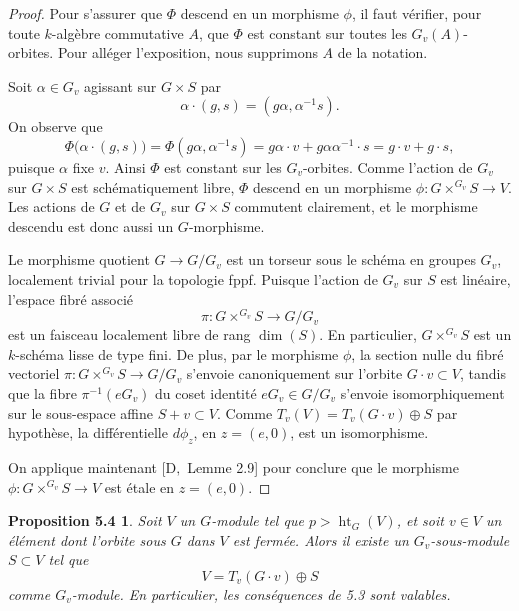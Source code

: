 \documentclass[11pt]{article}
\newcommand{\htG}{\operatorname{ht}_G}
\newtheorem*{proposition54}{Proposition 5.4}
\begin{document}
\begin{proof}
Pour s'assurer que \(\Phi\) descend en un morphisme \(\phi\), il faut vérifier, pour toute
\(k\)-algèbre commutative \(A\), que \(\Phi\) est constant sur toutes les
\(G_v(A)\)-orbites. Pour alléger l'exposition, nous supprimons \(A\) de la notation.

Soit \(\alpha\in G_v\) agissant sur \(G\times S\) par
\[
  \alpha\cdot(g,s)=(g\alpha,\alpha^{-1}s).
\]
On observe que
\[
  \Phi\bigl(\alpha\cdot(g,s)\bigr)=\Phi(g\alpha,\alpha^{-1}s)
  =g\alpha\cdot v+g\alpha\alpha^{-1}\cdot s
  =g\cdot v+g\cdot s,
\]
puisque \(\alpha\) fixe \(v\). Ainsi \(\Phi\) est constant sur les \(G_v\)-orbites. Comme
l'action de \(G_v\) sur \(G\times S\) est schématiquement libre, \(\Phi\) descend en un
morphisme \(\phi:G\times^{G_v}S\to V\). Les actions de \(G\) et de \(G_v\) sur
\(G\times S\) commutent clairement, et le morphisme descendu est donc aussi un
\(G\)-morphisme.

Le morphisme quotient \(G\to G/G_v\) est un torseur sous le schéma en groupes \(G_v\),
localement trivial pour la topologie fppf. Puisque l'action de \(G_v\) sur \(S\) est
linéaire, l'espace fibré associé
\[
  \pi:G\times^{G_v}S\longrightarrow G/G_v
\]
est un faisceau localement libre de rang \(\dim(S)\). En particulier,
\(G\times^{G_v}S\) est un \(k\)-schéma lisse de type fini. De plus, par le morphisme
\(\phi\), la section nulle du fibré vectoriel \(\pi:G\times^{G_v}S\to G/G_v\) s'envoie
canoniquement sur l'orbite \(G\cdot v\subset V\), tandis que la fibre \(\pi^{-1}(eG_v)\)
du coset identité \(eG_v\in G/G_v\) s'envoie isomorphiquement sur le sous-espace affine
\(S+v\subset V\). Comme \(T_v(V)=T_v(G\cdot v)\oplus S\) par hypothèse, la différentielle
\(d\phi_z\), en \(z=(e,0)\), est un isomorphisme.

On applique maintenant \([\mathrm D,\) Lemme 2.9] pour conclure que le morphisme
\(\phi:G\times^{G_v}S\to V\) est étale en \(z=(e,0)\).
\end{proof}

\begin{proposition54}
Soit \(V\) un \(G\)-module tel que \(p>\htG(V)\), et soit \(v\in V\) un élément dont
l'orbite sous \(G\) dans \(V\) est fermée. Alors il existe un \(G_v\)-sous-module
\(S\subset V\) tel que
\[
  V=T_v(G\cdot v)\oplus S
\]
comme \(G_v\)-module. En particulier, les conséquences de 5.3 sont valables.
\end{proposition54}
\end{document}
